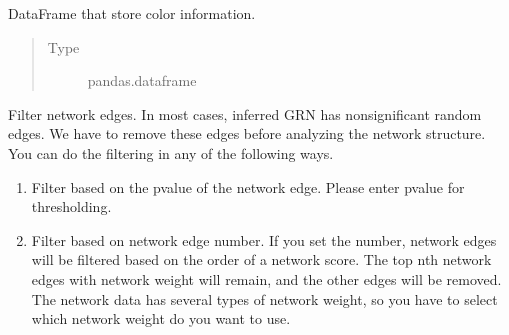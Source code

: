 \documentclass[letterpaper,10pt,english]{sphinxmanual}
\begin{document}
\begin{fulllineitems}
\begin{fulllineitems}
\end{fulllineitems}


\begin{fulllineitems}
\label{\detokenize{modules/celloracle:celloracle.Links.palette}}
DataFrame that store color information.
\begin{quote}\begin{description}
\item[{Type}] \leavevmode
pandas.dataframe

\end{description}\end{quote}

\end{fulllineitems}


\begin{fulllineitems}
\label{\detokenize{modules/celloracle:celloracle.Links.filter_links}}
Filter network edges.
In most cases, inferred GRN has non\sphinxhyphen{}significant random edges.
We have to remove these edges before analyzing the network structure.
You can do the filtering in any of the following ways.
\begin{enumerate}
%
\item {} 
Filter based on the p\sphinxhyphen{}value of the network edge.
Please enter p\sphinxhyphen{}value for thresholding.

\item {} 
Filter based on network edge number.
If you set the number, network edges will be filtered based on the order of a network score. The top n\sphinxhyphen{}th network edges with network weight will remain, and the other edges will be removed.
The network data has several types of network weight, so you have to select which network weight do you want to use.


\end{enumerate}
\end{fulllineitems}
\end{fulllineitems}
\end{document}
